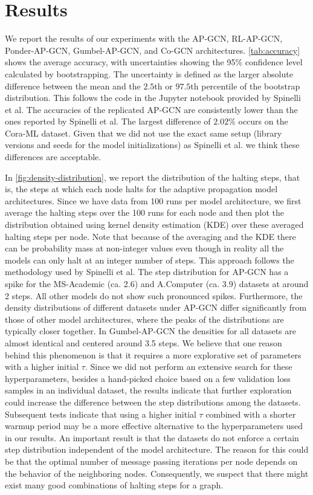 \documentclass{gdl}
\begin{document}
\section{Results}
We report the results of our experiments with the AP-GCN, RL-AP-GCN, Ponder-AP-GCN, Gumbel-AP-GCN, and Co-GCN architectures. \autoref{tab:accuracy} shows the average accuracy, with uncertainties showing the 95\% confidence level calculated by bootstrapping. The uncertainty is defined as the larger absolute difference between the mean and the $2.5$th or $97.5$th percentile of the bootstrap distribution. This follows the code in the Jupyter notebook provided by Spinelli et al. The accuracies of the replicated AP-GCN are consistently lower than the ones reported by Spinelli et al. The largest difference of $2.02\%$ occurs on the Cora-ML dataset. Given that we did not use the exact same setup (library versions and seeds for the model initializations) as Spinelli et al. we think these differences are acceptable. 

In \autoref{fig:density-distribution}, we report the distribution of the halting steps, that is, the steps at which each node halts for the adaptive propagation model architectures. Since we have data from 100 runs per model architecture, we first average the halting steps over the 100 runs for each node and then plot the distribution obtained using kernel density estimation (KDE) over these averaged halting steps per node. Note that because of the averaging and the KDE there can be probability mass at non-integer values even though in reality all the models can only halt at an integer number of steps. This approach follows the methodology used by Spinelli et al. The step distribution for AP-GCN has a spike for the MS-Academic (ca. 2.6) and A.Computer (ca. 3.9) datasets at around 2 steps. All other models do not show such pronounced spikes. Furthermore,  the density distributions of different datasets under AP-GCN differ significantly from those of other model architectures, where the peaks of the distributions are typically closer together. In Gumbel-AP-GCN the densities for all datasets are almost identical and centered around 3.5 steps. We believe that one reason behind this phenomenon is that it requires a more explorative set of parameters with a higher initial $\tau$. Since we did not perform an extensive search for these hyperparameters, besides a hand-picked choice based on a few validation loss samples in an individual dataset, the results indicate that further exploration could increase the difference between the step distributions among the datasets. Subsequent tests indicate that using a higher initial $\tau$ combined with a shorter warmup period may be a more effective alternative to the hyperparameters used in our results.
An important result is that the datasets do not enforce a certain step distribution independent of the model architecture. The reason for this could be that the optimal number of message passing iterations per node depends on the behavior of the neighboring nodes. Consequently, we suspect that there might exist many good combinations of halting steps for a graph.
\end{document}
